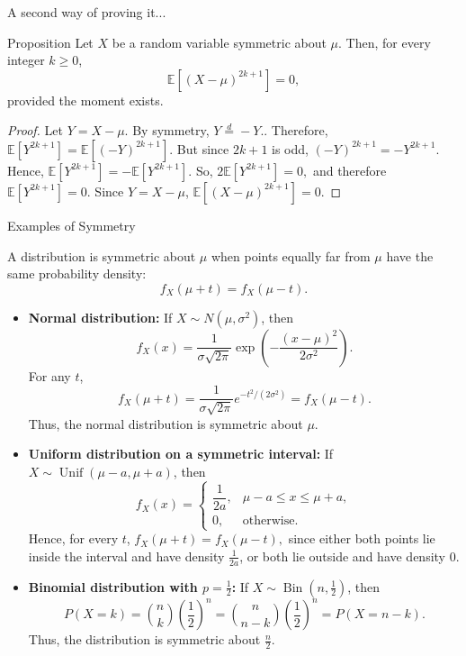 \begin{frame}{A second way of proving it...}

\begin{keybox}{Proposition}
Let \(X\) be a random variable symmetric about \(\mu\).
Then, for every integer \(k\geq 0\),
\[
\mathbb{E}\!\left[(X-\mu)^{2k+1}\right]=0,
\]
provided the moment exists.
\end{keybox}

\begin{proof}
Let $Y=X-\mu.$ By symmetry, $Y \overset{d}{=} -Y.
$. Therefore, $\mathbb{E}\left[Y^{2k+1}\right]
=
\mathbb{E}\left[(-Y)^{2k+1}\right].$ But since \(2k+1\) is odd, $(-Y)^{2k+1}=-Y^{2k+1}.$ Hence, $\mathbb{E}\left[Y^{2k+1}\right]
=
-\mathbb{E}\left[Y^{2k+1}\right].$ So, $2\mathbb{E}\left[Y^{2k+1}\right]=0,$ and therefore $\mathbb{E}\left[Y^{2k+1}\right]=0.$ Since \(Y=X-\mu\), $\mathbb{E}\!\left[(X-\mu)^{2k+1}\right]=0.$
\end{proof}

\end{frame}



\begin{frame}{Examples of Symmetry}
\small

A distribution is symmetric about $\mu$ when points equally far from $\mu$
have the same probability density:
\[
f_X(\mu+t)=f_X(\mu-t).
\]

\begin{itemize}
    \item \textbf{Normal distribution:}
    If $X\sim N(\mu,\sigma^2)$, then
    \[
    f_X(x)=\frac{1}{\sigma\sqrt{2\pi}}
    \exp\left(-\frac{(x-\mu)^2}{2\sigma^2}\right).
    \]
    For any $t$,
    \[
    f_X(\mu+t)
    =
    \frac{1}{\sigma\sqrt{2\pi}}
    e^{-t^2/(2\sigma^2)}
    =
    f_X(\mu-t).
    \]
    Thus, the normal distribution is symmetric about $\mu$.

    \item \textbf{Uniform distribution on a symmetric interval:}
    If $X\sim \operatorname{Unif}(\mu-a,\mu+a)$, then
    \[
    f_X(x)=
    \begin{cases}
        \dfrac{1}{2a}, & \mu-a\le x\le \mu+a,\\
        0, & \text{otherwise}.
    \end{cases}
    \]
    Hence, for every $t$, $   f_X(\mu+t)=f_X(\mu-t),$ since either both points lie inside the interval and have density
    $\frac{1}{2a}$, or both lie outside and have density $0$.

    \item \textbf{Binomial distribution with $p=\frac12$:}
    If $X\sim\operatorname{Bin}(n,\frac12)$, then
    \[
    P(X=k)=\binom{n}{k}\left(\frac12\right)^n=\binom{n}{n-k}\left(\frac12\right)^n=P(X=n-k).
    \]
    Thus, the distribution is symmetric about $\frac n2$.
\end{itemize}

\end{frame}




